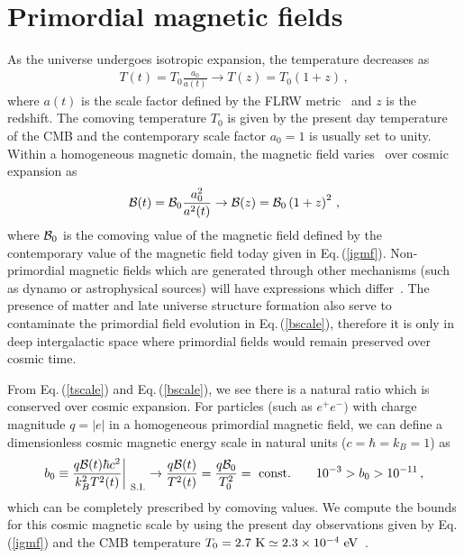 \documentclass[a4paper]{article}
\newcommand*{\eV}{\text{ eV}}
\newcommand{\req}[1]{Eq.\,(\ref{#1})}
\begin{document}
\section{Primordial magnetic fields}
\label{sec:primordial}
\noindent As the universe undergoes isotropic expansion, the temperature decreases as 
\begin{align}
    \label{tscale}
    T(t)=T_{0}\frac{a_{0}}{a(t)}\rightarrow T(z)=T_{0}(1+z)\,,
\end{align}
where $a(t)$ is the scale factor defined by the FLRW metric~\cite{weinberg1972gravitation} and $z$ is the redshift. The comoving temperature $T_{0}$ is given by the present day temperature of the CMB and the contemporary scale factor $a_{0}=1$ is usually set to unity. Within a homogeneous magnetic domain, the magnetic field varies~\cite{durrer2013cosmological} over cosmic expansion as
\begin{align}
    \label{bscale}
    {\cal B}(t)={\cal B}_{0}\frac{a_{0}^{2}}{a^{2}(t)}\rightarrow{\cal B}(z)={\cal B}_{0}\left(1+z\right)^{2}\,,
\end{align}
where ${\cal B}_{0}$ is the comoving value of the magnetic field defined by the contemporary value of the magnetic field today given in \req{igmf}. Non-primordial magnetic fields which are generated through other mechanisms (such as dynamo or astrophysical sources) will have expressions which differ~\cite{pomakov2022redshift}. The presence of matter and late universe structure formation also serve to contaminate the primordial field evolution in \req{bscale}, therefore it is only in deep intergalactic space where primordial fields would remain preserved over cosmic time.

From \req{tscale} and \req{bscale}, we see there is a natural ratio which is conserved over cosmic expansion. For particles (such as $e^{+}e^{-})$ with charge magnitude $q=|e|$ in a homogeneous primordial magnetic field, we can define a dimensionless cosmic magnetic energy scale in natural units ($c=\hbar=k_{B}=1$) as
\begin{align}
    \label{tbscale}
    b_{0}\equiv\frac{q{\cal B}(t)\hbar c^{2}}{k_{B}^{2}T^{2}(t)}\bigg\vert_{\rm\ S.I.}\rightarrow\frac{q{\cal B}(t)}{T^{2}(t)}=\frac{q{\cal B}_{0}}{T_{0}^{2}}={\rm\ const.}\qquad10^{-3}>b_{0}>10^{-11}\,,
\end{align}
which can be completely prescribed by comoving values. We compute the bounds for this cosmic magnetic scale by using the present day observations given by \req{igmf} and the CMB temperature $T_{0}=2.7{\rm\ K}\simeq2.3\times10^{-4}\eV$~\cite{aghanim2018planck}.
\end{document}
